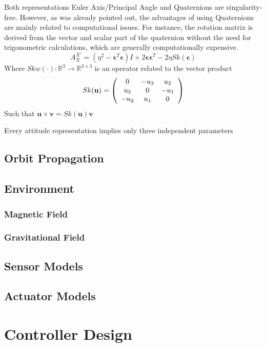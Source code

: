 Both representations Euler Axis/Principal Angle and Quaternions are singularity-free. However, as was already pointed out, the advantages of using Quaternions are mainly related to computational issues. For instance, the rotation matrix is derived from the vector and scalar part of the quaternion without the need for trigonometric calculations, which are generally computationally expensive.
\begin{equation}
A_X^{X'} = (\eta^2 - \pmb{\epsilon}^T \pmb{\epsilon}) I +
2\pmb{\epsilon}\pmb{\epsilon}^T - 2\eta Sk(\pmb{\epsilon})
\end{equation}
Where $Skw(\cdot): \mathbb{R}^3 \longrightarrow \mathbb{R}^{3\times 3}$ is an operator related to the vector product 
\begin{equation}
Sk(\mathbf{u}) = 
\left(\begin{array}{c c c}
0 & -u_3 & u_2 \\
u_3 & 0 & -u_1 \\
-u_2 & u_1 & 0
\end{array} \right)
\end{equation}
Such that $\mathbf{u}\times\mathbf{v} = Sk(\mathbf{u})\mathbf{v}$


Every attitude representation implies only three independent parameters

\subsection{Orbit Propagation}

\subsection{Environment}

\subsubsection{Magnetic Field}
\subsubsection{Gravitational Field}

\subsection{Sensor Models}

\subsection{Actuator Models}

\section{Controller Design}
